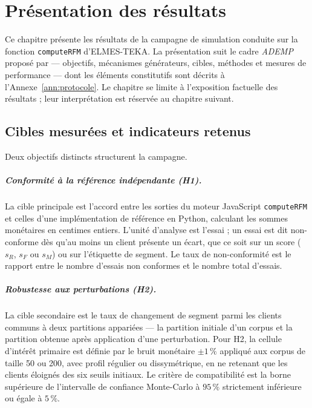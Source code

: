\chapter{Présentation des résultats}
\label{chap:resultats}

Ce chapitre présente les résultats de la campagne de simulation conduite sur la fonction
\texttt{computeRFM} d'ELMES-TEKA. La présentation suit le cadre \emph{ADEMP} proposé par
\citet{Morris2019} — objectifs, mécanismes générateurs, cibles, méthodes et mesures de
performance — dont les éléments constitutifs sont décrits à l'Annexe~\ref{ann:protocole}.
Le chapitre se limite à l'exposition factuelle des résultats ; leur interprétation est réservée
au chapitre suivant.

\section{Cibles mesurées et indicateurs retenus}
\label{sec:resultats-cibles}

Deux objectifs distincts structurent la campagne.

\paragraph{Conformité à la référence indépendante (H1).}
La cible principale est l'accord entre les sorties du moteur JavaScript \texttt{computeRFM}
et celles d'une implémentation de référence en Python, calculant les sommes monétaires en
centimes entiers. L'unité d'analyse est l'essai ; un essai est dit non-conforme dès qu'au
moins un client présente un écart, que ce soit sur un score ($s_R$, $s_F$ ou $s_M$) ou sur
l'étiquette de segment. Le taux de non-conformité est le rapport entre le nombre d'essais
non conformes et le nombre total d'essais.

\paragraph{Robustesse aux perturbations (H2).}
La cible secondaire est le taux de changement de segment parmi les clients communs à deux
partitions appariées — la partition initiale d'un corpus et la partition obtenue après
application d'une perturbation. Pour H2, la cellule d'intérêt primaire est définie par le
bruit monétaire $\pm1\,\%$ appliqué aux corpus de taille 50 ou 200, avec profil régulier ou
dissymétrique, en ne retenant que les clients éloignés des six seuils initiaux. Le critère
de compatibilité est la borne supérieure de l'intervalle de confiance Monte-Carlo à $95\,\%$
strictement inférieure ou égale à $5\,\%$.

